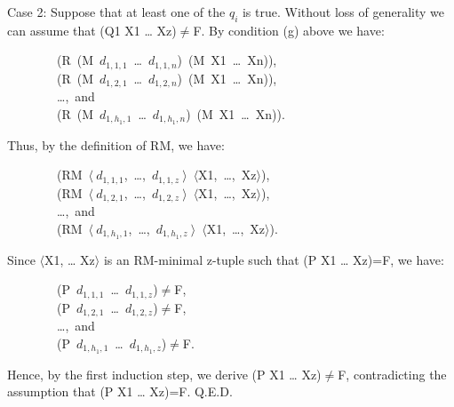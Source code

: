 \documentclass[10pt]{book}
\newenvironment{pubasis}{\begin{flushleft}}{\end{flushleft}}
\begin{document}
Case 2:  Suppose that at least one of the $q_{i}$ is true.
Without loss of generality we can assume that (Q1 X1 \ldots{} Xz)$\neq$F.
By condition (g) above we have:
\begin{pubasis}
~~~~~~~~(R~(M~$d_{1,1,1}$~\ldots{}~$d_{1,1,n}$)~(M~X1~\ldots{}~Xn)),\\

~~~~~~~~(R~(M~$d_{1,2,1}$~\ldots{}~$d_{1,2,n}$)~(M~X1~\ldots{}~Xn)),~\\

~~~~~~~~\ldots{},~and\\

~~~~~~~~(R~(M~$d_{1,h_{1},1}$~\ldots{}~$d_{1,h_{1},n}$)~(M~X1~\ldots{}~Xn)).\\
\end{pubasis}
Thus, by the definition of RM, we have:

\begin{pubasis}
~~~~~~~~(RM~$\langle~d_{1,1,1}$,~\ldots{},~$d_{1,1,z}~\rangle$~$\langle$X1,~\ldots{},~Xz$\rangle$),\\

~~~~~~~~(RM~$\langle~d_{1,2,1}$,~\ldots{},~$d_{1,2,z}~\rangle$~$\langle$X1,~\ldots{},~Xz$\rangle$),\\

~~~~~~~~\ldots{},~and\\

~~~~~~~~(RM~$\langle~d_{1,h_{1},1}$,~\ldots{},~$d_{1,h_{1},z}~\rangle$~$\langle$X1,~\ldots{},~Xz$\rangle$).\\
\end{pubasis}
Since $\langle$X1, \ldots{} Xz$\rangle$ is an RM-minimal z-tuple such that (P X1 \ldots{} Xz)=F,
we have:
\begin{pubasis}
~~~~~~~~(P~$d_{1,1,1}$~\ldots{}~$d_{1,1,z}$)$\neq$F,\\

~~~~~~~~(P~$d_{1,2,1}$~\ldots{}~$d_{1,2,z}$)$\neq$F,\\

~~~~~~~~\ldots{},~and\\

~~~~~~~~(P~$d_{1,h_{1},1}$~\ldots{}~$d_{1,h_{1},z}$)$\neq$F.\\
\end{pubasis}
Hence, by the first induction
step, we derive (P X1 \ldots{} Xz)$\neq$F, contradicting the assumption that
(P X1 \ldots{} Xz)=F.  Q.E.D.
\end{document}
